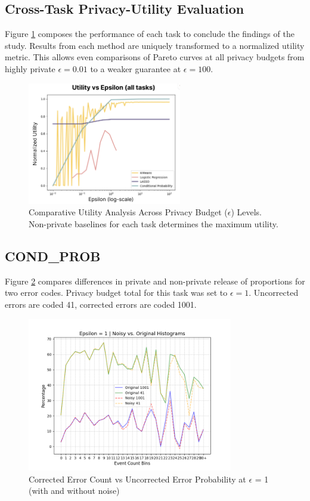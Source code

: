 \documentclass[12pt,letterpaper]{article}
\begin{document}
\subsection{Cross-Task Privacy-Utility Evaluation}

Figure \ref{fig:meta} composes the performance of each task to conclude the findings of the study. Results from each method are uniquely transformed to a normalized utility metric. This allows even comparisons of Pareto curves at all privacy budgets from highly private $\epsilon=0.01$ to a weaker guarantee at $\epsilon=100$.

\begin{figure}[H]
  \centering
  \includegraphics[width=0.6\textwidth]{figure/meta.png}
  \caption{Comparative Utility Analysis Across Privacy Budget ($\epsilon$) Levels. Non-private baselines for each task determines the maximum utility.}
  \label{fig:meta}
\end{figure}

\subsection{COND\_PROB}

Figure \ref{fig:histoeps} compares differences in private and non-private release of proportions for two error codes. Privacy budget total for this task was set to $\epsilon=1$. Uncorrected errors are coded 41, corrected errors are coded 1001. 

\begin{figure}[H]
    \centering
    \includegraphics[width=0.8\textwidth]{figure/histoeps1.png}
    \caption{Corrected Error Count vs Uncorrected Error Probability at $\epsilon$ = 1 (with and without noise)}
    \label{fig:histoeps}
\end{figure}
\end{document}
